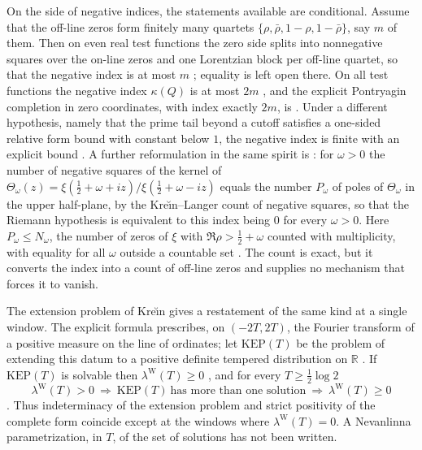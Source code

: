 \documentclass[11pt]{amsart}
\theoremstyle{definition}
\theoremstyle{remark}
\numberwithin{equation}{section}
\newcommand{\R}{\mathbb{R}}
\newcommand{\lamW}{\lambda^{\mathrm W}(T)}             %
\begin{document}
On the side of negative indices, the statements available are conditional. Assume that the
off-line zeros form finitely many quartets $\{\rho,\bar\rho,1-\rho,1-\bar\rho\}$, say $m$ of them.
Then on even real test functions the zero side splits into nonnegative squares over the on-line
zeros and one Lorentzian block per off-line quartet, so that the negative index is at most $m$
\cite[Theorem~3.1 and Corollary~6.5]{P18}; equality is left open there. On all test functions the
negative index $\kappa(Q)$ is at most $2m$ \cite[Lemma~4.6]{P25}, and the explicit Pontryagin
completion in zero coordinates, with index exactly $2m$, is \cite[Proposition~4.7]{P25}. Under a
different hypothesis, namely that the prime tail beyond a cutoff satisfies a one-sided relative
form bound with constant below $1$, the negative index is finite with an explicit bound
\cite[Proposition~2.1]{P11}. A further reformulation in the same spirit is
\cite[Theorem~4.1 and Corollary~4.2]{P35}: for $\omega>0$ the number of negative squares of the
kernel of $\Theta_\omega(z)=\xi(\frac12+\omega+iz)/\xi(\frac12+\omega-iz)$ equals the number
$P_\omega$ of poles of $\Theta_\omega$ in the upper half-plane, by the Kre\u{\i}n--Langer count of
negative squares, so that the Riemann hypothesis is equivalent to this index being $0$ for every
$\omega>0$. Here $P_\omega\le N_\omega$, the number of zeros of $\xi$ with $\Re\rho>\frac12+\omega$
counted with multiplicity, with equality for all $\omega$ outside a countable set
\cite[Theorem~4.1]{P35}. The count is exact, but it converts the index into a count of off-line
zeros and supplies no mechanism that forces it to vanish.

The extension problem of Kre\u{\i}n gives a restatement of the same kind at a single window. The
explicit formula prescribes, on $(-2T,2T)$, the Fourier transform of a positive measure on the
line of ordinates; let $\mathrm{KEP}(T)$ be the problem of extending this datum to a positive
definite tempered distribution on $\R$ \cite[Definition~6.6]{P46}. If $\mathrm{KEP}(T)$ is
solvable then $\lamW\ge0$ \cite[Theorem~6.9]{P46}, and for every $T\ge\frac12\log2$
\[
\lamW>0\ \Longrightarrow\ \mathrm{KEP}(T)\ \text{has more than one solution}\ \Longrightarrow\ \lamW\ge0
\]
\cite[Theorem~6.10]{P46}. Thus indeterminacy of the extension problem and strict positivity of the
complete form coincide except at the windows where $\lamW=0$. A Nevanlinna parametrization, in
$T$, of the set of solutions has not been written.
\end{document}
